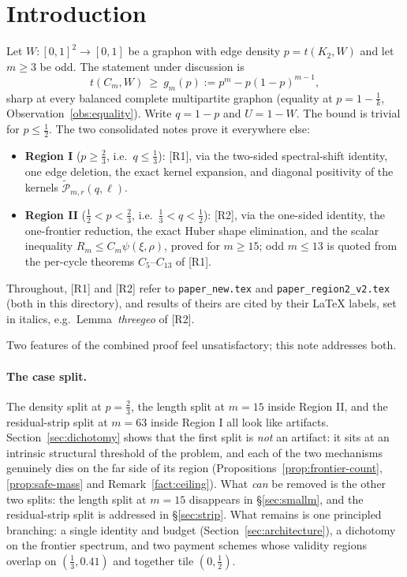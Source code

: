 \documentclass[11pt]{article}
\theoremstyle{remark}
\theoremstyle{plain}
\theoremstyle{plain}
\newcommand{\wtP}{\widetilde{\mathcal P}}
\begin{document}
\tableofcontents

\section{Introduction}\label{sec:intro}

Let $W:[0,1]^2\to[0,1]$ be a graphon with edge density $p=t(K_2,W)$ and let
$m\ge3$ be odd.  The statement under discussion is
\begin{equation}\label{eq:conj}
        t(C_m,W)\ \ge\ g_m(p):=p^m-p(1-p)^{m-1},
\end{equation}
sharp at every balanced complete multipartite graphon (equality at
$p=1-\tfrac1k$, Observation~\ref{obs:equality}).  Write $q=1-p$ and
$U=1-W$.  The bound is trivial for $p\le\tfrac12$.  The two consolidated
notes prove it everywhere else:
\begin{itemize}[leftmargin=2em]
\item \textbf{Region I} ($p\ge\tfrac23$, i.e.\ $q\le\tfrac13$): [R1], via
the two-sided spectral-shift identity, one edge deletion, the exact kernel
expansion, and diagonal positivity of the kernels $\wtP_{m,r}(q,\ell)$.
\item \textbf{Region II} ($\tfrac12<p<\tfrac23$, i.e.\
$\tfrac13<q<\tfrac12$): [R2], via the one-sided identity, the one-frontier
reduction, the exact Huber shape elimination, and the scalar inequality
$R_m\le C_m\psi(\xi,\rho)$, proved for $m\ge15$; odd $m\le13$ is quoted
from the per-cycle theorems $C_5$--$C_{13}$ of [R1].
\end{itemize}
Throughout, [R1] and [R2] refer to \texttt{paper\_new.tex} and
\texttt{paper\_region2\_v2.tex} (both in this directory), and results of
theirs are cited by their \LaTeX{} labels, set in italics, e.g.\
Lemma~\emph{threegeo} of [R2].

Two features of the combined proof feel unsatisfactory; this note
addresses both.

\paragraph{The case split.}  The density split at $p=\tfrac23$, the length
split at $m=15$ inside Region II, and the residual-strip split at $m=63$
inside Region I all look like artifacts.  Section~\ref{sec:dichotomy}
shows that the first split is \emph{not} an artifact: it sits at an
intrinsic structural threshold of the problem, and each of the two
mechanisms genuinely dies on the far side of its region
(Propositions~\ref{prop:frontier-count}, \ref{prop:safe-mass} and
Remark~\ref{fact:ceiling}).  What \emph{can} be removed is the other two
splits: the length split at $m=15$ disappears in \S\ref{sec:smallm}, and
the residual-strip split is addressed in \S\ref{sec:strip}.  What remains
is one principled branching: a single identity and budget
(Section~\ref{sec:architecture}), a dichotomy on the frontier spectrum,
and two payment schemes whose validity regions overlap on
$(\tfrac13,0.41)$ and together tile $(0,\tfrac12)$.
\end{document}
